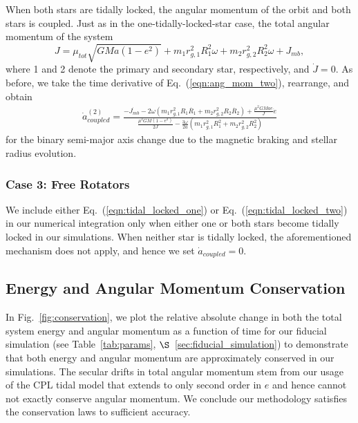 When both stars are tidally locked, the angular momentum of the orbit and both stars is coupled.  Just as in the one-tidally-locked-star case, the total angular momentum of the system 
\begin{equation} \label{eqn:ang_mom_two}
J = \mu_{tot} \sqrt{GMa(1-e^2)} + m_1 r_{g,1}^2 R_1^2 \omega + m_2 r_{g,2}^2 R_2^2 \omega + J_{mb},
\end{equation}
where 1 and 2 denote the primary and secondary star, respectively, and $\dot{J} = 0$.  As before, we take the time derivative of Eq.~(\ref{eqn:ang_mom_two}), rearrange, and obtain
\small
\begin{equation} \label{eqn:tidal_locked_two}
\begin{split}
\dot{a}_{coupled}^{(2)} = \frac{-\dot{J_{mb}} - 2 \omega \left( m_1 r_{g,1}^2 R_1 \dot{R_1} + m_2 r_{g,2}^2 R_2 \dot{R_2} \right) + \frac{\mu^2 G M a e }{J} \dot{e}}
{\frac{\mu^2 G M (1-e^2)}{2J} - \frac{3 \omega}{2a} \left( m_1 r_{g,1}^2 R_1^2 + m_2 r_{g,2}^2 R_2^2 \right)}
\end{split}
\end{equation}
\normalsize
for the binary semi-major axis change due to the magnetic braking and stellar radius evolution.  

\subsubsection{Case 3: Free Rotators}

We include either Eq.~(\ref{eqn:tidal_locked_one}) or Eq.~(\ref{eqn:tidal_locked_two}) in our numerical integration only when either one or both stars become tidally locked in our simulations.  When neither star is tidally locked, the aforementioned mechanism does not apply, and hence we set $\dot{a}_{coupled} = 0$.

\subsection{Energy and Angular Momentum Conservation} \label{sec:conservation}

In Fig.~\ref{fig:conservation}, we plot the relative absolute change in both the total system energy and angular momentum as a function of time for our fiducial simulation (see Table~\ref{tab:params}, $\S$~\ref{sec:fiducial_simulation}) to demonstrate that both energy and angular momentum are approximately conserved in our 
\vplanet simulations.  The secular drifts in total angular momentum stem from our usage of the CPL tidal model that extends to only second order in $e$ and hence cannot not exactly conserve angular momentum.  We conclude our methodology satisfies the conservation laws to sufficient accuracy.


